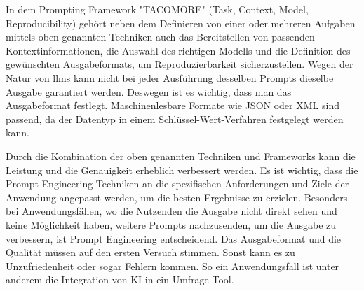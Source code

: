 In dem Prompting Framework "TACOMORE" (Task, Context, Model, Reproducibility) gehört neben dem Definieren von einer oder mehreren Aufgaben mittels oben genannten Techniken auch das Bereitstellen von passenden Kontextinformationen, die Auswahl des richtigen Modells und die Definition des gewünschten Ausgabeformats, um Reproduzierbarkeit sicherzustellen. Wegen der Natur von \acp{llm} kann nicht bei jeder Ausführung desselben Prompts dieselbe Ausgabe garantiert werden. Deswegen ist es wichtig, dass man das Ausgabeformat festlegt. Maschinenlesbare Formate wie JSON oder XML sind passend, da der Datentyp in einem Schlüssel-Wert-Verfahren festgelegt werden kann. \cite{prompt-tacomore}

Durch die Kombination der oben genannten Techniken und Frameworks kann die Leistung und die Genauigkeit erheblich verbessert werden. Es ist wichtig, dass die Prompt Engineering Techniken an die spezifischen Anforderungen und Ziele der Anwendung angepasst werden, um die besten Ergebnisse zu erzielen. Besonders bei Anwendungsfällen, wo die Nutzenden die Ausgabe nicht direkt sehen und keine Möglichkeit haben, weitere Prompts nachzusenden, um die Ausgabe zu verbessern, ist Prompt Engineering entscheidend. Das Ausgabeformat und die Qualität müssen auf den ersten Versuch stimmen. Sonst kann es zu Unzufriedenheit oder sogar Fehlern kommen. So ein Anwendungsfall ist unter anderem die Integration von KI in ein Umfrage-Tool.